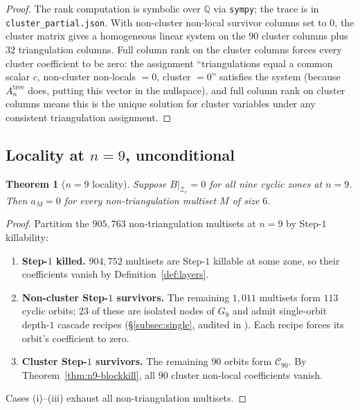 \documentclass[11pt]{article}
\newtheorem{thm}{Theorem}
\theoremstyle{definition}
\begin{document}
\begin{proof}
The rank computation is symbolic over $\mathbb Q$ via
\texttt{sympy}; the trace is in
\verb|cluster_partial.json|. With non-cluster non-local survivor
columns set to $0$, the cluster matrix gives a homogeneous linear
system on the $90$ cluster columns plus $32$ triangulation columns.
Full column rank on the cluster columns forces every cluster
coefficient to be zero: the assignment ``triangulations equal a
common scalar $c$, non-cluster non-locals $=0$, cluster $=0$''
satisfies the system (because $A_n^{\mathrm{tree}}$ does, putting
this vector in the nullspace), and full column rank on cluster
columns means this is the unique solution for cluster variables
under any consistent triangulation assignment.
\end{proof}

\subsection{Locality at $n=9$, unconditional}\label{subsec:locality}

\begin{thm}[$n=9$ locality]\label{thm:n9-locality}
Suppose $B\big|_{\mathcal Z_r}=0$ for all nine cyclic zones at
$n=9$. Then $a_M=0$ for every non-triangulation multiset $M$ of
size $6$.
\end{thm}

\begin{proof}
Partition the $905{,}763$ non-triangulation multisets at $n=9$ by
Step-$1$ killability:
\begin{enumerate}[label=(\roman*),leftmargin=2em]
\item \textbf{Step-$1$ killed.} $904{,}752$ multisets are
Step-$1$ killable at some zone, so their coefficients vanish by
Definition~\ref{def:layers}.
\item \textbf{Non-cluster Step-$1$ survivors.} The remaining
$1{,}011$ multisets form $113$ cyclic orbits; $23$ of these are
isolated nodes of $G_9$ and admit single-orbit depth-$1$ cascade
recipes (\S\ref{subsec:single}, audited in \cite{n9status}). Each
recipe forces its orbit's coefficient to zero.
\item \textbf{Cluster Step-$1$ survivors.} The remaining $90$
orbits form $\mathcal C_{90}$. By Theorem~\ref{thm:n9-blockkill},
all $90$ cluster non-local coefficients vanish.
\end{enumerate}
Cases (i)--(iii) exhaust all non-triangulation multisets.
\end{proof}
\end{document}
